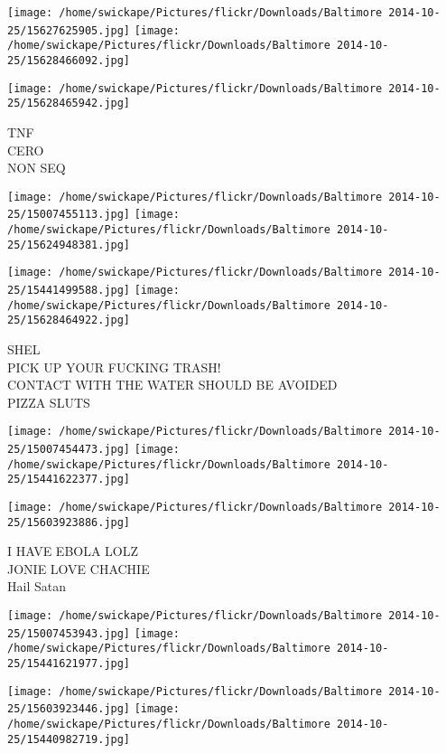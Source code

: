 \documentclass[10pt,letterpaper]{article}
\begin{document}
\texttt{[image: /home/swickape/Pictures/flickr/Downloads/Baltimore 2014-10-25/15627625905.jpg]}
\texttt{[image: /home/swickape/Pictures/flickr/Downloads/Baltimore 2014-10-25/15628466092.jpg]}

\vspace{0.25in}
\texttt{[image: /home/swickape/Pictures/flickr/Downloads/Baltimore 2014-10-25/15628465942.jpg]}

TNF\\
CERO\\
NON SEQ
\pagebreak

\texttt{[image: /home/swickape/Pictures/flickr/Downloads/Baltimore 2014-10-25/15007455113.jpg]}
\texttt{[image: /home/swickape/Pictures/flickr/Downloads/Baltimore 2014-10-25/15624948381.jpg]}

\texttt{[image: /home/swickape/Pictures/flickr/Downloads/Baltimore 2014-10-25/15441499588.jpg]}
\texttt{[image: /home/swickape/Pictures/flickr/Downloads/Baltimore 2014-10-25/15628464922.jpg]}

SHEL\\
PICK UP YOUR FUCKING TRASH!\\
CONTACT WITH THE WATER SHOULD BE AVOIDED\\
PIZZA SLUTS
\pagebreak

\texttt{[image: /home/swickape/Pictures/flickr/Downloads/Baltimore 2014-10-25/15007454473.jpg]}
\texttt{[image: /home/swickape/Pictures/flickr/Downloads/Baltimore 2014-10-25/15441622377.jpg]}

\vspace{0.25in}
\texttt{[image: /home/swickape/Pictures/flickr/Downloads/Baltimore 2014-10-25/15603923886.jpg]}

I HAVE EBOLA LOLZ\\
JONIE LOVE CHACHIE\\
Hail Satan
\pagebreak

\texttt{[image: /home/swickape/Pictures/flickr/Downloads/Baltimore 2014-10-25/15007453943.jpg]}
\texttt{[image: /home/swickape/Pictures/flickr/Downloads/Baltimore 2014-10-25/15441621977.jpg]}

\texttt{[image: /home/swickape/Pictures/flickr/Downloads/Baltimore 2014-10-25/15603923446.jpg]}
\texttt{[image: /home/swickape/Pictures/flickr/Downloads/Baltimore 2014-10-25/15440982719.jpg]}
\end{document}
